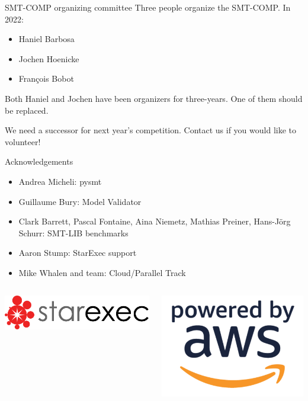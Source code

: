 \documentclass[table]{beamer}
\def\emph#1{\textcolor{MYblue}{#1}}
\begin{document}
\begin{frame}{SMT-COMP organizing committee}
  Three people organize the SMT-COMP.  In 2022:
  \begin{itemize}
  \item Haniel Barbosa
  \item Jochen Hoenicke
  \item Fran\c{c}ois Bobot
  \end{itemize}

  Both Haniel and Jochen have been organizers for three-years. One of them
  should be replaced.
  \bigskip

  We need a successor for next year's competition.
  Contact us if you would like to volunteer!
\end{frame}


\begin{frame}{Acknowledgements}
  \begin{itemize}
    \item \emph{Andrea Micheli}: pysmt
    \item \emph{Guillaume Bury}: Model Validator
    \item \emph{Clark Barrett, Pascal Fontaine, Aina Niemetz, Mathias Preiner, Hans-Jörg Schurr}: SMT-LIB benchmarks
    \item \emph{Aaron Stump}: StarExec support
    \item \emph{Mike Whalen and team}: Cloud/Parallel Track
  \end{itemize}
  \bigskip

  \begin{columns}
    \begin{column}{.3\textwidth}
      \includegraphics[width=\textwidth]{starlogo}
    \end{column}
    \begin{column}{.17\textwidth}
      \includegraphics[width=\textwidth]{powered-by-aws}
    \end{column}
  \end{columns}
\end{frame}
\end{document}
